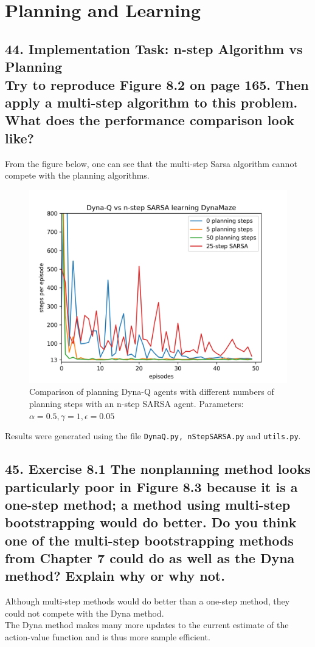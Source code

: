 \newpage
\section*{Planning and Learning}
\subsection*{44. Implementation Task: n-step Algorithm vs Planning\\Try to reproduce Figure 8.2 on page 165. Then apply a multi-step algorithm to this problem. What does the performance comparison look like?}
From the figure below, one can see that the multi-step Sarsa algorithm cannot compete with the planning algorithms.
\begin{figure}[H]
\centering
\captionsetup{width=.5\linewidth}
\includegraphics[width=.5\linewidth]{./planning_vs_nstep.png}
\caption{Comparison of planning Dyna-Q agents with different numbers of planning steps with an n-step SARSA agent. Parameters: $\alpha = 0.5, \gamma = 1, \epsilon = 0.05$}
\end{figure}
Results were generated using the file \texttt{DynaQ.py, nStepSARSA.py} and \texttt{utils.py}.

\subsection*{45. Exercise 8.1 The nonplanning method looks particularly poor in Figure 8.3 because it is a one-step method; a method using multi-step bootstrapping would do better. Do you think one of the multi-step bootstrapping methods from Chapter 7 could do as well as the Dyna method? Explain why or why not.}
Although multi-step methods would do better than a one-step method, they could not compete with the Dyna method.\\
The Dyna method makes many more updates to the current estimate of the action-value function and is thus more sample efficient.
\newpage


